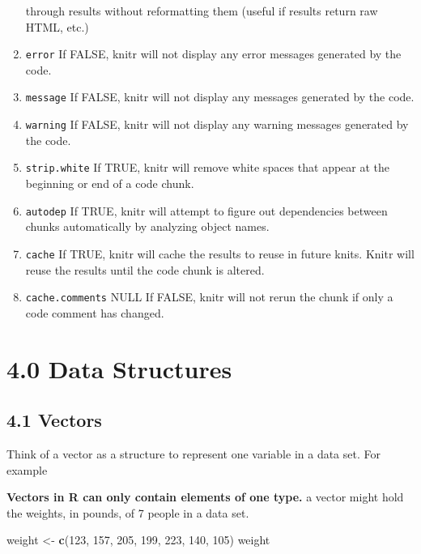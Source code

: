 \documentclass[]{article}
\newenvironment{Shaded}{\begin{snugshade}}{\end{snugshade}}
\newcommand{\KeywordTok}[1]{\textcolor[rgb]{0.13,0.29,0.53}{\textbf{#1}}}
\newcommand{\DecValTok}[1]{\textcolor[rgb]{0.00,0.00,0.81}{#1}}
\newcommand{\StringTok}[1]{\textcolor[rgb]{0.31,0.60,0.02}{#1}}
\newcommand{\NormalTok}[1]{#1}
\begin{document}
\begin{enumerate}
  through results without reformatting them (useful if results return
  raw HTML, etc.)
\item
  \texttt{error} If FALSE, knitr will not display any error messages
  generated by the code.
\item
  \texttt{message} If FALSE, knitr will not display any messages
  generated by the code.
\item
  \texttt{warning} If FALSE, knitr will not display any warning messages
  generated by the code.
\item
  \texttt{strip.white} If TRUE, knitr will remove white spaces that
  appear at the beginning or end of a code chunk.
\item
  \texttt{autodep} If TRUE, knitr will attempt to figure out
  dependencies between chunks automatically by analyzing object names.
\item
  \texttt{cache} If TRUE, knitr will cache the results to reuse in
  future knits. Knitr will reuse the results until the code chunk is
  altered.
\item
  \texttt{cache.comments} NULL If FALSE, knitr will not rerun the chunk
  if only a code comment has changed.
\end{enumerate}

\section{4.0 Data Structures}\label{data-structures}

\subsection{4.1 Vectors}\label{vectors}

Think of a vector as a structure to represent one variable in a data
set. For example

\textbf{Vectors in R can only contain elements of one type.} a vector
might hold the weights, in pounds, of 7 people in a data set.

\begin{Shaded}
\begin{Highlighting}[]
\NormalTok{weight <-}\StringTok{ }\KeywordTok{c}\NormalTok{(}\DecValTok{123}\NormalTok{, }\DecValTok{157}\NormalTok{, }\DecValTok{205}\NormalTok{, }\DecValTok{199}\NormalTok{, }\DecValTok{223}\NormalTok{, }\DecValTok{140}\NormalTok{, }\DecValTok{105}\NormalTok{)}
\NormalTok{weight}
\end{Highlighting}
\end{Shaded}
\end{document}
